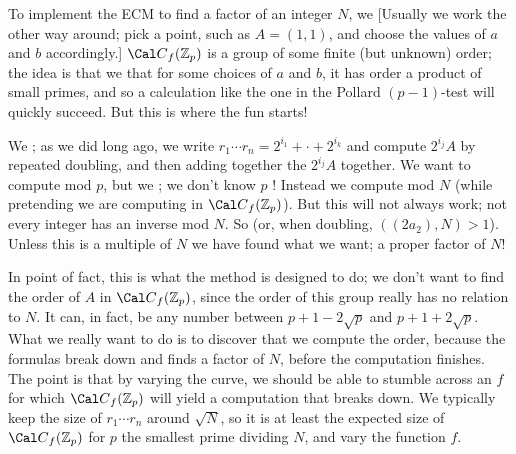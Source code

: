 \ssk



\ssk

To implement the ECM to find a factor of an integer $N$, 
we  [Usually we work the other
way around; pick a point, such 
as $A=(1,1)$, and choose the values of $a$ and $b$
accordingly.] ${\Cal C}_f({\Bbb Z}_p)$ is a group of 
some finite (but unknown) order; the idea is
that we  that for some choices of 
$a$ and $b$, it has order a product of small primes, and so
a calculation like the one in the Pollard $(p-1)$-test 
will quickly succeed. But this is where the fun starts!

\ssk

We ; as we did
long ago, we write $r_1\cdots r_n = 2^{i_1}+\cdot +2^{i_k}$
and compute $2^{i_j}A$ 
by repeated doubling, and then adding 
together the $2^{i_j}A$ together.
We want to compute mod $p$, but we ; we don't know
$p$ ! Instead we compute mod $N$ (while 
pretending we are computing in ${\Cal C}_f({\Bbb Z}_p)$).
But this will not always work; not every integer has an 
inverse mod $N$. So 
(or, when doubling, \hhsk $((2a_2),N)>1$). 
Unless this is a multiple of $N$ 
we have found what 
we want; a proper factor of $N$! 

\ssk

In point of fact, this is 
what the method is designed to do; we don't
want to find the order of $A$ in ${\Cal C}_f({\Bbb Z}_p)$, 
since the order of this group really 
has no relation to $N$. It can, in fact, be any number 
between $p+1-2\sqrt{p}$ and $p+1+2\sqrt{p}$.
What we really want to do is to discover that we 
 compute the order, because the
formulas break down and finds a factor of $N$, before
the computation finishes. The point is that by varying 
the curve, we should be able to stumble across 
an $f$ for which ${\Cal C}_f({\Bbb Z}_p)$ will 
yield a computation that breaks down.
We typically 
keep the size of $r_1\cdots r_n$ around $\sqrt{N}$, so 
it is at least the expected size of ${\Cal C}_f({\Bbb Z}_p)$
for $p$ the smallest prime dividing $N$, and vary the function $f$.



